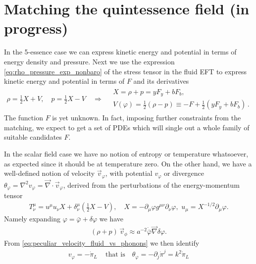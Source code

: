 \section{Matching the quintessence field {\color{red}(in progress)}}

In the 5-essence case we can express kinetic energy and potential in terms of energy density and pressure. 
Next we use the expression \eqref{eq:rho_pressure_exp_nonbaro} of the stress tensor in the fluid EFT to express kinetic energy and potential in terms of $F$ and its derivatives
\begin{align}\label{eq:identiyinf_rho_p_vs_scalar_field}
    \rho=\tfrac12 X +V, \quad p =\tfrac12 X -V\quad \Rightarrow\quad \begin{array}{c}
        X=\rho+p = yF_y + bF_b,\\
        V(\varphi) = \tfrac12(\rho - p) \equiv -F +\tfrac12 (yF_y+ bF_b)\,.
    \end{array}
\end{align}
The function $F$ is yet unknown.
In fact, imposing further constraints from the matching, we expect to get a set of PDEs which will single out a whole family of suitable candidates $F$.

In the scalar field case we have no notion of entropy or temperature whatsoever, as expected since it should be at temperature zero.
On the other hand, we have a well-defined notion of velocity $\vec{v}_\varphi$, with potential $v_\varphi$ or divergence $\theta_\varphi=\nabla^2v_\varphi=\vec{\nabla}\cdot\vec{v}_\varphi$, derived from the perturbations of the energy-momentum tensor
\begin{align}
    T^{\mu}_{\nu}=u^\mu u_\nu X+\delta^{\mu}_{\nu}(\tfrac12 X-V), \quad X=-\partial_\mu\varphi g^{\mu\nu}\partial_\nu\varphi, \,\, u_\mu=X^{-1/2}\partial_\mu\varphi.
\end{align}
Namely expanding $\varphi=\bar{\varphi}+\delta\varphi$ we have
\begin{align}
    (\rho+p)\,\vec{v}_\phi\approx a^{-2}\dot{\bar{\varphi}}\vec{\nabla} \delta\varphi.
\end{align}
From \eqref{eq:peculiar_velocity_fluid_vs_phonons} we then identify
\begin{align}\label{eq:identifying_scalar_field_velocity_vs_phonon}
    v_\varphi = -\dot{\pi}_L\, \quad\text{that is}\quad \theta_\varphi=-\partial_j\dot{\pi}^j=k^2\dot{\pi}_L
\end{align}

